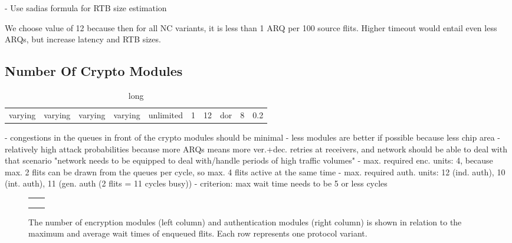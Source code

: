 - Use sadias formula for RTB size estimation

We choose value of 12 because then for all NC variants, it is less than 1 ARQ per 100 source flits. Higher timeout would entail even less ARQs, but
increase latency and RTB sizes.

\subsection{Number Of Crypto Modules}
\begin{table}
    \centering
    \begin{tabulary}{\textwidth}{C|C|C|C|C|C|C|C|C|C}
        \pProtVar{} & \pNCMode{} & \pEncMods{} & \pAuthMods{} & \pRQSize{} & \pARQLimit{} & \pARQTimeout{} & \pRStrat{} & \pNumAttackers{} & \pAttackProb{} \\\hline
        varying     & varying    & varying     & varying      & unlimited  & 1            & 12             & \gls{dor}  & 8                & 0.2 \\
    \end{tabulary}
    \caption[Input parameters for number of crypto modules experiment]{long}
    \label{tab:setupnumcrypto}
\end{table}
- congestions in the queues in front of the crypto modules should be minimal
- less modules are better if possible because less chip area
- relatively high attack probabilities because more ARQs means more ver.+dec. retries at receivers, and network should be able to deal with that scenario
  "network needs to be equipped to deal with/handle periods of high traffic volumes"
- max. required enc. units: 4, because max. 2 flits can be drawn from the queues per cycle, so max. 4 flits active at the same time
- max. required auth. units: 12 (ind. auth), 10 (int. auth), 11 (gen. auth (2 flits = 11 cycles busy))
- criterion: max wait time needs to be 5 or less cycles

\begin{figure}
    \centering
    \begin{tabular}{ll}
         &  \\
         &  \\
         & 
    \end{tabular}
    \caption[Results for number of crypto modules experiment]{The number of encryption modules (left column) and authentication modules (right column)
    is shown in relation to the maximum and average wait times of enqueued flits. Each row represents one protocol variant.}
    \label{fig:resultscryptomodules}
\end{figure}


